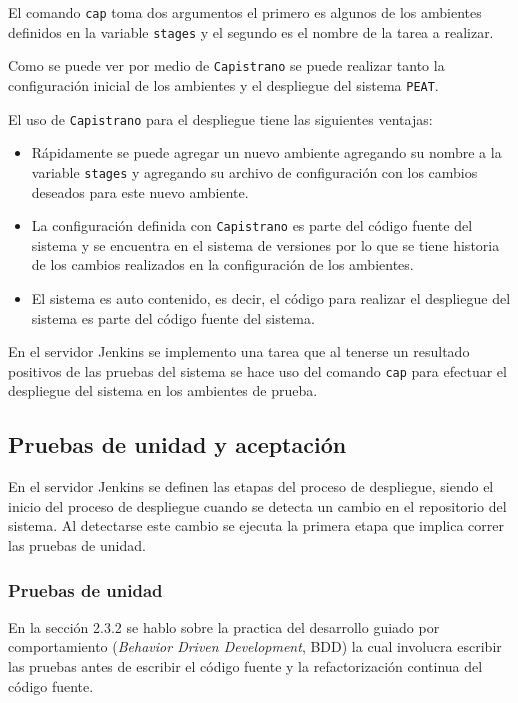 El comando \texttt{cap} toma dos argumentos el primero es algunos de los
ambientes definidos en la variable \texttt{stages} y el segundo es el nombre
de la tarea a realizar.

Como se puede ver por medio de \texttt{Capistrano} se puede realizar tanto
la configuración inicial de los ambientes y el despliegue del sistema \texttt{PEAT}.

El uso de \texttt{Capistrano} para el despliegue tiene las siguientes ventajas:
\begin{itemize}
\item Rápidamente se puede agregar un nuevo ambiente agregando su nombre a la
  variable \texttt{stages} y agregando su archivo de configuración con los
  cambios deseados para este nuevo ambiente.
\item La configuración definida con \texttt{Capistrano} es parte del código fuente
  del sistema y se encuentra en el sistema de versiones por lo que se tiene historia
  de los cambios realizados en la configuración de los ambientes.
\item El sistema es auto contenido, es decir, el código para realizar el despliegue
  del sistema es parte del código fuente del sistema.
\end{itemize}

En el servidor Jenkins se implemento una tarea que al tenerse un resultado
positivos de las pruebas del sistema se hace uso del comando \texttt{cap}
para efectuar el despliegue del sistema en los ambientes de prueba.

\subsection{Pruebas de unidad y aceptación}

En el servidor Jenkins se definen las etapas del proceso de despliegue, siendo
el inicio del proceso de despliegue cuando se detecta un cambio en el repositorio
del sistema. Al detectarse este cambio se ejecuta la primera etapa que implica
correr las pruebas de unidad.

\subsubsection{Pruebas de unidad}

En la sección 2.3.2 se hablo sobre la practica del desarrollo guiado por
comportamiento (\textit{Behavior Driven Development}, BDD) la cual involucra
escribir las pruebas antes de escribir el código fuente y la refactorización
continua del código fuente.

